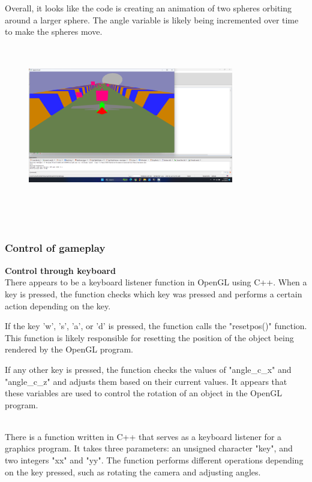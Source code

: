 \documentclass[12pt,a4]{article}
\begin{document}
{Overall, it looks like the code is creating an animation of two spheres orbiting around a larger sphere. The angle variable is likely being incremented over time to make the spheres move.\\
\begin{figure}[h]
    \centering
    \includegraphics[width=0.8\textwidth,height=7cm]{Screenshot (59).png}
\end{figure}\\
\newpage
\subsubsection{Control of gameplay }
\textbf{\Large{Control through keyboard}}\\
There appears to be a keyboard listener function in OpenGL using C++. When a key is pressed, the function checks which key was pressed and performs a certain action depending on the key.

If the key 'w', 's', 'a', or 'd' is pressed, the function calls the "resetpos()" function. This function is likely responsible for resetting the position of the object being rendered by the OpenGL program.

If any other key is pressed, the function checks the values of "angle_c_x" and "angle_c_z" and adjusts them based on their current values. It appears that these variables are used to control the rotation of an object in the OpenGL program.

\\

There is a function written in C++ that serves as a keyboard listener for a graphics program. It takes three parameters: an unsigned character "key", and two integers "xx" and "yy". The function performs different operations depending on the key pressed, such as rotating the camera and adjusting angles.

}
\end{document}
